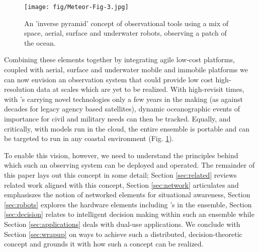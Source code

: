 \begin{figure}[!]
  \centering
  \texttt{[image: fig/Meteor-Fig-3.jpg]}
  \caption{An 'inverse pyramid' concept of observational tools using a
    mix of space, aerial, surface and underwater robots, observing a
    patch of the ocean.}
  \label{fig:concept-2}
\end{figure}


Combining these elements together by integrating agile low‐cost \sml
platforms, coupled with aerial, surface and underwater mobile and
immobile platforms we can now envision an observation system that
could provide low cost high‐resolution data at scales which are yet to
be realized. With high-revisit times, with \smle's carrying novel
technologies only a few years in the making (as against decades for
legacy agency based satellites), dynamic oceanographic events of
importance for civil and military needs can then be tracked. Equally,
and critically, with models run in the cloud, the entire ensemble is
portable and can be targeted to run in any coastal environment
(Fig. \ref{fig:concept-2}).

To enable this vision, however, we need to understand the principles
behind which such an observing system can be deployed and
operated. The remainder of this paper lays out this concept in some
detail; Section \ref{sec:related} reviews related work aligned with
this concept, Section \ref{sec:network} articulates and emphasiszes
the notion of networked elements for situational awareness, Section
\ref{sec:robots} explores the hardware elements including \smle's in
the ensemble, Section \ref{sec:decision} relates to intelligent
decision making within such an ensemble while Section
\ref{sec:applications} deals with dual-use applications. We conclude
with Section \ref{sec:wrapup} on ways to achieve such a distributed,
decision-theoretic concept and grounds it with how such a concept can
be realized. 